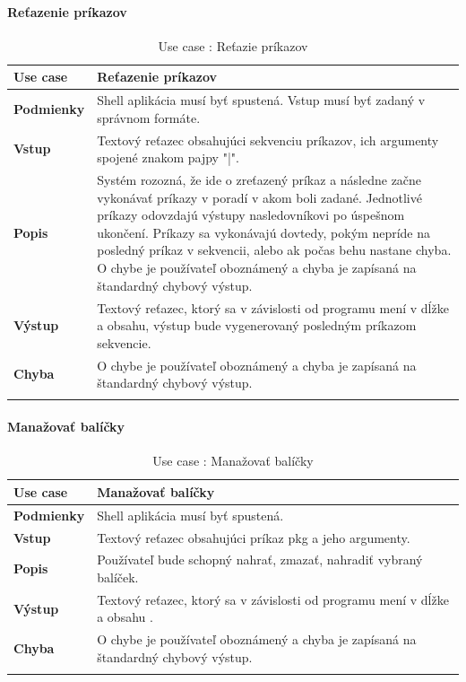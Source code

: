 \paragraph{Reťazenie príkazov}
\begin{center}
	\begin{longtable}{|p{2.5cm}|p{12.2cm}|}

			\hline
			\textbf{Use case} & Reťazenie príkazov \\ 
			\hline
			\textbf{Podmienky} & Shell aplikácia musí byť spustená. Vstup musí byť zadaný v správnom formáte.\\ 
			\hline
			\textbf{Vstup} & Textový reťazec obsahujúci sekvenciu príkazov, ich argumenty spojené znakom pajpy "|".\\
			\hline
			\textbf{Popis} & Systém rozozná, že ide o zreťazený príkaz a následne začne vykonávať príkazy v poradí v akom boli zadané. Jednotlivé príkazy odovzdajú  výstupy nasledovníkovi po úspešnom ukončení. Príkazy sa vykonávajú dovtedy, pokým nepríde na posledný príkaz v sekvencii, alebo ak počas behu nastane chyba. O chybe je používateľ oboznámený a chyba je zapísaná na štandardný chybový výstup. \\ 
			\hline

			\textbf{Výstup} & Textový reťazec, ktorý sa v závislosti od programu mení v dĺžke a obsahu, výstup bude vygenerovaný posledným príkazom sekvencie.\\
			\hline

			\textbf{Chyba} & O chybe je používateľ oboznámený a chyba je zapísaná na štandardný chybový výstup.\\
			\hline
	\caption{Use case : Reťazie príkazov}
	\label{table:1}

	\end{longtable}
\end{center}


\paragraph{Manažovať balíčky}
\begin{center}
	\begin{longtable}{|p{2.5cm}|p{12.2cm}|}

			\hline
			\textbf{Use case} & Manažovať balíčky \\ 
			\hline
			\textbf{Podmienky} & Shell aplikácia musí byť spustená.\\ 
			\hline
			\textbf{Vstup} & Textový reťazec obsahujúci príkaz pkg a jeho argumenty.\\
			\hline
			\textbf{Popis} & Používateľ bude schopný nahrať, zmazať, nahradiť vybraný balíček. \\ 
			\hline
			\textbf{Výstup} & Textový reťazec, ktorý sa v závislosti od programu mení v dĺžke a obsahu .\\
			\hline
			\textbf{Chyba} & O chybe je používateľ oboznámený a chyba je zapísaná na štandardný chybový výstup.\\
			\hline
	\caption{Use case : Manažovať balíčky}
	\label{table:1}

	\end{longtable}
\end{center}
